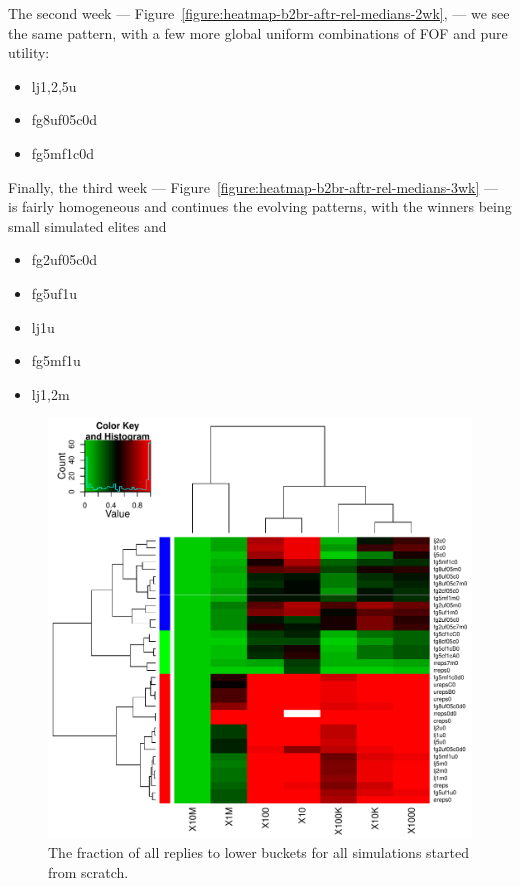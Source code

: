 \documentclass[10pt,oneside]{memoir}
\begin{document}
\begin{Spacing}{2}
The second week --- Figure~\ref{figure:heatmap-b2br-aftr-rel-medians-2wk}, --- we see the same pattern, with a few more global uniform combinations of FOF and pure utility:


\begin{itemize}


\item lj{1,2,5}u

\item fg8uf05c0d

\item fg5mf1c0d
\end{itemize}

Finally, the third week --- Figure~\ref{figure:heatmap-b2br-aftr-rel-medians-3wk} --- is fairly homogeneous and continues the evolving patterns, with the winners being small simulated elites and


\begin{itemize}


\item fg2uf05c0d

\item fg5uf1u

\item lj1u

\item fg5mf1u

\item lj{1,2}m
\end{itemize}


\begin{figure}
\begin{center}
    \includegraphics{figures/crop/heatmap-b2br-aftr-rel-medians-0wk}
    \caption{The fraction of all replies to lower buckets for all simulations started from scratch.}
    \label{figure:heatmap-b2br-aftr-rel-medians-0wk}
\end{center}
\end{figure}


\end{Spacing}
\end{document}
